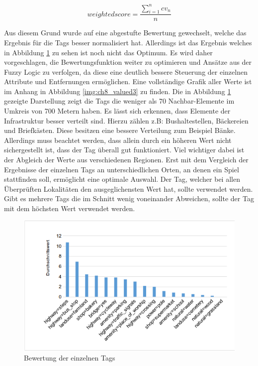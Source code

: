 \begin{equation}
weighted score = \frac{ \sum\limits_{i=1}^n cv_n }{n}
\end{equation}

Aus diesem Grund wurde auf eine abgestufte Bewertung gewechselt, welche das Ergebnis für die Tags besser normalisiert hat.
Allerdings ist das Ergebnis welches in Abbildung \ref{img:ch6_img07_result1} zu sehen ist noch nicht das Optimum. Es wird daher vorgeschlagen, die Bewertungsfunktion weiter zu optimieren und Ansätze aus der Fuzzy Logic zu verfolgen, da diese eine deutlich bessere Steuerung der einzelnen Attribute und Entfernungen ermöglichen. Eine vollständige Grafik aller Werte ist im Anhang in Abbildung \ref{img:ch8_valued3} zu finden. Die in Abbildung \ref{img:ch6_img07_result1} gezeigte Darstellung zeigt die Tags die weniger als 70 Nachbar-Elemente im Umkreis von 700 Metern haben.
Es lässt sich erkennen, dass Elemente der Infrastruktur besser verteilt sind. Hierzu zählen z.B: Bushaltestellen, Bäckereien und Briefkästen. Diese besitzen eine bessere Verteilung zum Beispiel Bänke. Allerdings muss beachtet werden, dass allein durch ein höheren Wert nicht sichergestellt ist, dass der Tag überall gut funktioniert. Viel wichtiger dabei ist der Abgleich der Werte aus verschiedenen Regionen. Erst mit dem Vergleich der Ergebnisse der einzelnen Tags an unterschiedlichen Orten, an denen ein Spiel stattfinden soll, ermöglicht eine optimale Auswahl.
Der Tag, welcher bei allen Überprüften Lokalitäten den ausgeglichensten Wert hat, sollte verwendet werden. Gibt es mehrere Tags die im Schnitt wenig voneinander Abweichen, sollte der Tag mit dem höchsten Wert verwendet werden. 

\begin{figure}[H]
\begin{center}
\includegraphics[width=150mm]{images/ch6_img07_result1.png}
\caption{Bewertung der einzelnen Tags}
\label{img:ch6_img07_result1}
\end{center}
\end{figure}
